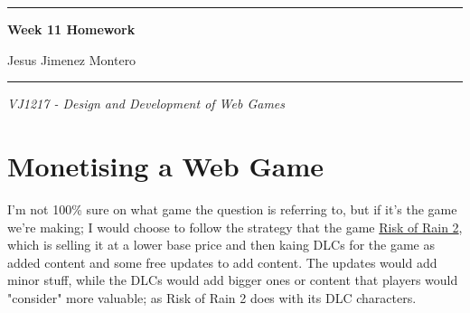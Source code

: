 \documentclass[12pt]{article}
\begin{document}
\begin{titlepage}
        \begin{center}


        \hrule
        \vspace{1cm}
        \vspace{1cm}
        {\bfseries\huge Week 11 Homework\par}
        \vspace{2cm}

        {\large
        Jesus Jimenez Montero \\
        \par}
        \vspace{1cm}
        \hrule
        \vspace{1cm}

        {\large
        \textit{VJ1217 - Design and Development of Web Games}
        \par}
        \end{center}
\end{titlepage}

\newpage
\renewcommand{\contentsname}{Content Table}
\setcounter{secnumdepth}{5}
\tableofcontents
\setcounter{tocdepth}{4}

\newpage


\section{Monetising a Web Game}
I'm not 100\% sure on what game the question is referring to, but if it's the game we're making; I would choose to follow the strategy that the game \href{https://store.steampowered.com/app/632360/Risk_of_Rain_2/}{Risk of Rain 2}, which is selling it at a lower base price and then kaing DLCs for the game as added content and some free updates to add content. The updates would add minor stuff, while the DLCs would add bigger ones or content that players would "consider" more valuable; as Risk of Rain 2 does with its DLC characters.
\end{document}
